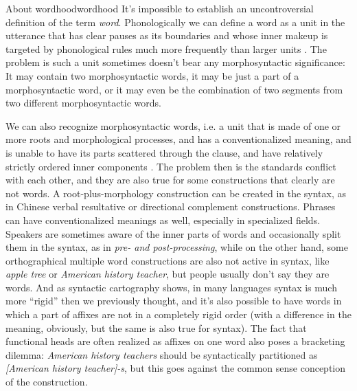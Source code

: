 \documentclass[UTF8, a4paper, oneside, scheme=plain]{ctexrep}
\newcommand*{\citesec}[1]{\S~{#1}}
\newcommand*{\term}[1]{\emph{#1}}
\newcommand{\corpus}[1]{\emph{#1}}
\begin{document}
\begin{theorybox}{About wordhood}{wordhood}
    It's impossible to establish an uncontroversial definition of the term \term{word}.
    Phonologically we can define a word as a unit in the utterance
    that has clear pauses as its boundaries and 
    whose inner makeup is targeted by phonological rules much more frequently
    than larger units \citep[\citesec{10.3}]{dixon2010basic2}.
    The problem is such a unit sometimes doesn't bear any morphosyntactic significance:
    It may contain two morphosyntactic words,
    it may be just a part of a morphosyntactic word,
    or it may even be the combination of two segments from two different morphosyntactic words.

    We can also recognize morphosyntactic words, 
    i.e. a unit that is made of one or more roots and morphological processes, and
    has a conventionalized meaning, and
    is unable to have its parts scattered through the clause,
    and have relatively strictly ordered inner components
    \citep[\citesec{10.4}]{dixon2010basic2}.
    The problem then is the standards conflict with each other,
    and they are also true for some constructions that clearly are not words.
    A root-plus-morphology construction 
    can be created in the syntax,
    as in Chinese verbal resultative or directional complement constructions.
    Phrases can have conventionalized meanings as well,
    especially in specialized fields.
    Speakers are sometimes aware of the inner parts of words 
    and occasionally split them in the syntax,
    as in \corpus{pre- and post-processing},
    while on the other hand,
    some orthographical multiple word constructions 
    are also not active in syntax,
    like \corpus{apple tree} or \corpus{American history teacher},
    but people usually don't say they are words.
    And as syntactic cartography shows,
    in many languages syntax is much more ``rigid'' then we previously thought,
    and it's also possible to have words in which a part of affixes are not in a completely rigid order
    (with a difference in the meaning, obviously, but the same is also true for syntax).
    The fact that functional heads are often realized as affixes on one word
    also poses a bracketing dilemma:
    \corpus{American history teachers} should be syntactically partitioned as 
    \corpus{[American history teacher]-s},
    but this goes against the common sense conception of the construction.


\end{theorybox}
\end{document}
